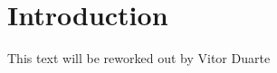 % 
%  
%
\chapter{Introduction}
\label{cha:introduction}

This text will be reworked out by Vitor Duarte

% 
% 
% 
% 
% 
% 
% 
% 
% 
